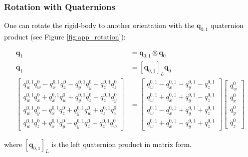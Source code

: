 \documentclass[12pt]{report}
\numberwithin{figure}{section}
\begin{document}
\begin{appendices}
\subsubsection{Rotation with Quaternions}

One can rotate the rigid-body to another orientation with the 
$\mathbf{q}_{0,1}$ quaternion product (see Figure \ref{fig:app_rotation}):

\begin{equation}
\begin{aligned}
  \mathbf{q}_1 &= \mathbf{q}_{0,1} \otimes \mathbf{q}_0\\
  \mathbf{q}_1 &= [\mathbf{q}_{0,1}]_L \mathbf{q}_0\\
  \begin{bmatrix} 
    q_w^{0,1} q_w^0 - q_x^{0,1} q_x^0 - q_y^{0,1} q_y^0 - q_z^{0,1} q_z^0  \\ 
    q_w^{0,1} q_x^0 + q_x^{0,1} q_w^0 + q_y^{0,1} q_z^0 - q_z^{0,1} q_y^0  \\ 
    q_w^{0,1} q_y^0 - q_x^{0,1} q_z^0 + q_y^{0,1} q_w^0 + q_z^{0,1} q_x^0  \\ 
    q_w^{0,1} q_z^0 + q_x^{0,1} q_y^0 - q_y^{0,1} q_x^0 + q_z^{0,1} q_w^0  
  \end{bmatrix} & = 
  \begin{bmatrix} 
    q_w^{0,1} - q_x^{0,1} - q_y^{0,1} - q_z^{0,1}  \\ 
    q_w^{0,1} + q_x^{0,1} + q_y^{0,1} - q_z^{0,1}  \\ 
    q_w^{0,1} - q_x^{0,1} + q_y^{0,1} + q_z^{0,1}  \\ 
    q_w^{0,1} + q_x^{0,1} - q_y^{0,1} + q_z^{0,1}  
  \end{bmatrix}
  \begin{bmatrix} q_w^0 \\ q_x^0 \\ q_y^0 \\ q_z^0 \end{bmatrix}
\end{aligned}
\end{equation}

where $[\mathbf{q}_{0,1}]_L$ is the left quaternion product in matrix form.


\end{appendices}
\end{document}
